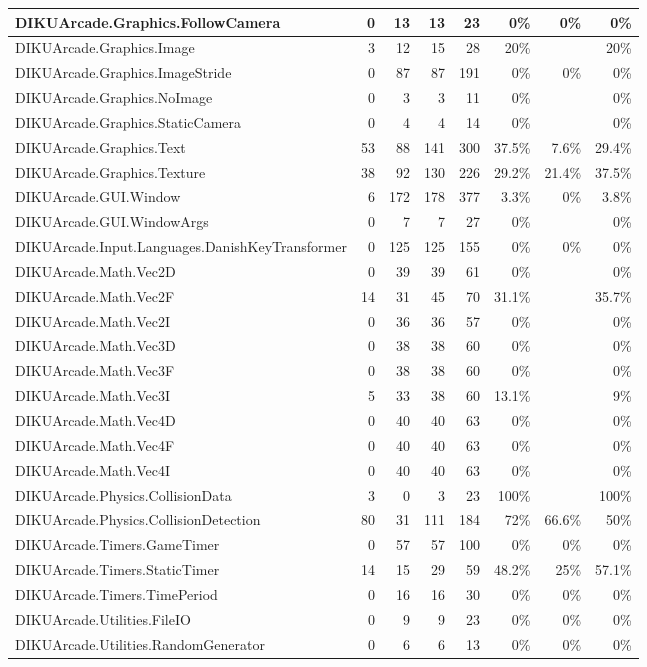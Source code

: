 \documentclass[a4paper,landscape,10pt]{article}
\begin{document}
\begin{longtable}[l]{|l|r|r|r|r|r|r|r|}
\hline
DIKUArcade.Graphics.FollowCamera & 0 & 13 & 13 & 23 & 0\% & 0\% & 0\%\\
\hline
DIKUArcade.Graphics.Image & 3 & 12 & 15 & 28 & 20\% &  & 20\%\\
\hline
DIKUArcade.Graphics.ImageStride & 0 & 87 & 87 & 191 & 0\% & 0\% & 0\%\\
\hline
DIKUArcade.Graphics.NoImage & 0 & 3 & 3 & 11 & 0\% &  & 0\%\\
\hline
DIKUArcade.Graphics.StaticCamera & 0 & 4 & 4 & 14 & 0\% &  & 0\%\\
\hline
DIKUArcade.Graphics.Text & 53 & 88 & 141 & 300 & 37.5\% & 7.6\% & 29.4\%\\
\hline
DIKUArcade.Graphics.Texture & 38 & 92 & 130 & 226 & 29.2\% & 21.4\% & 37.5\%\\
\hline
DIKUArcade.GUI.Window & 6 & 172 & 178 & 377 & 3.3\% & 0\% & 3.8\%\\
\hline
DIKUArcade.GUI.WindowArgs & 0 & 7 & 7 & 27 & 0\% &  & 0\%\\
\hline
DIKUArcade.Input.Languages.DanishKeyTransformer & 0 & 125 & 125 & 155 & 0\% & 0\% & 0\%\\
\hline
DIKUArcade.Math.Vec2D & 0 & 39 & 39 & 61 & 0\% &  & 0\%\\
\hline
DIKUArcade.Math.Vec2F & 14 & 31 & 45 & 70 & 31.1\% &  & 35.7\%\\
\hline
DIKUArcade.Math.Vec2I & 0 & 36 & 36 & 57 & 0\% &  & 0\%\\
\hline
DIKUArcade.Math.Vec3D & 0 & 38 & 38 & 60 & 0\% &  & 0\%\\
\hline
DIKUArcade.Math.Vec3F & 0 & 38 & 38 & 60 & 0\% &  & 0\%\\
\hline
DIKUArcade.Math.Vec3I & 5 & 33 & 38 & 60 & 13.1\% &  & 9\%\\
\hline
DIKUArcade.Math.Vec4D & 0 & 40 & 40 & 63 & 0\% &  & 0\%\\
\hline
DIKUArcade.Math.Vec4F & 0 & 40 & 40 & 63 & 0\% &  & 0\%\\
\hline
DIKUArcade.Math.Vec4I & 0 & 40 & 40 & 63 & 0\% &  & 0\%\\
\hline
DIKUArcade.Physics.CollisionData & 3 & 0 & 3 & 23 & 100\% &  & 100\%\\
\hline
DIKUArcade.Physics.CollisionDetection & 80 & 31 & 111 & 184 & 72\% & 66.6\% & 50\%\\
\hline
DIKUArcade.Timers.GameTimer & 0 & 57 & 57 & 100 & 0\% & 0\% & 0\%\\
\hline
DIKUArcade.Timers.StaticTimer & 14 & 15 & 29 & 59 & 48.2\% & 25\% & 57.1\%\\
\hline
DIKUArcade.Timers.TimePeriod & 0 & 16 & 16 & 30 & 0\% & 0\% & 0\%\\
\hline
DIKUArcade.Utilities.FileIO & 0 & 9 & 9 & 23 & 0\% & 0\% & 0\%\\
\hline
DIKUArcade.Utilities.RandomGenerator & 0 & 6 & 6 & 13 & 0\% & 0\% & 0\%\\
\hline
\end{longtable}
\newpage
\end{document}
